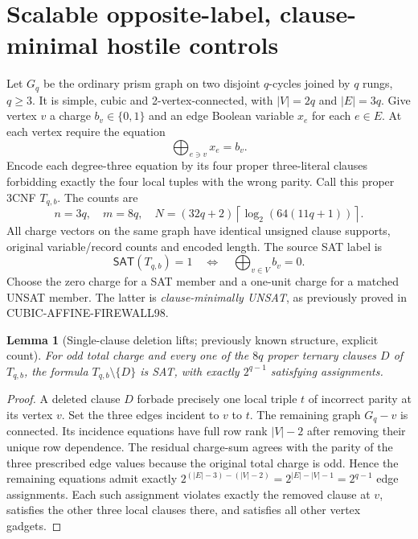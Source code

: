 \documentclass[11pt]{article}
\newtheorem{lemma}[theorem]{Lemma}
\newcommand{\SAT}{\mathsf{SAT}}
\begin{document}
\section{Scalable opposite-label, clause-minimal hostile controls}
Let $G_q$ be the ordinary prism graph on two disjoint $q$-cycles joined by $q$ rungs, $q\ge3$. It is simple, cubic and 2-vertex-connected, with $|V|=2q$ and $|E|=3q$. Give vertex $v$ a charge $b_v\in\{0,1\}$ and an edge Boolean variable $x_e$ for each $e\in E$. At each vertex require the equation
\[
 \bigoplus_{e\ni v}x_e=b_v.
\]
Encode each degree-three equation by its four proper three-literal clauses forbidding exactly the four local tuples with the wrong parity. Call this proper 3CNF $T_{q,b}$. The counts are
\[
 n=3q,\quad m=8q,\quad
 N=(32q+2)\left\lceil\log_2(64(11q+1))\right\rceil.
 \tag{5}
\]
All charge vectors on the same graph have identical unsigned clause supports, original variable/record counts and encoded length. The source SAT label is
\[
 \SAT(T_{q,b})=1\quad\Longleftrightarrow\quad
 \bigoplus_{v\in V}b_v=0.
 \tag{6}
\]
Choose the zero charge for a SAT member and a one-unit charge for a matched UNSAT member. The latter is \emph{clause-minimally UNSAT}, as previously proved in CUBIC-AFFINE-FIREWALL98.

\begin{lemma}[Single-clause deletion lifts; previously known structure, explicit count]
For odd total charge and every one of the $8q$ proper ternary clauses $D$ of $T_{q,b}$, the formula $T_{q,b}\setminus\{D\}$ is SAT, with exactly $2^{q-1}$ satisfying assignments.
\end{lemma}
\begin{proof}
A deleted clause $D$ forbade precisely one local triple $t$ of incorrect parity at its vertex $v$. Set the three edges incident to $v$ to $t$. The remaining graph $G_q-v$ is connected. Its incidence equations have full row rank $|V|-2$ after removing their unique row dependence. The residual charge-sum agrees with the parity of the three prescribed edge values because the original total charge is odd. Hence the remaining equations admit exactly
$2^{(|E|-3)-(|V|-2)}=2^{|E|-|V|-1}=2^{q-1}$ edge assignments. Each such assignment violates exactly the removed clause at $v$, satisfies the other three local clauses there, and satisfies all other vertex gadgets.
\end{proof}
\end{document}
